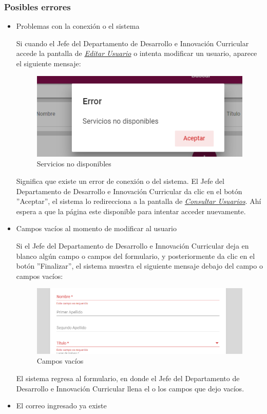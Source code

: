 \subsubsection{Posibles errores}
\begin{itemize}
	\item Problemas con la conexión o el sistema
	
	Si cuando el Jefe del Departamento de Desarrollo e Innovación Curricular accede la pantalla de \hyperlink{editarUs}{\textit{Editar Usuario}} o intenta modificar un usuario, aparece el siguiente mensaje:
	\clearpage
	\begin{figure}[H]
		\centering
		\includegraphics[width=0.4\linewidth]{images/SP5/MSGSN}
		\caption{Servicios no disponibles}
		
	\end{figure}
	
	
	Significa que existe un error de conexión o del sistema. El Jefe del Departamento de Desarrollo e Innovación Curricular da clic en el botón ''Aceptar'', el sistema lo redirecciona  a la pantalla de \hyperlink{consultarUs}{\textit{Consultar Usuarios}}. Ahí  espera a que la página este disponible para intentar acceder nuevamente.
	
	\item Campos vacíos al momento de modificar al usuario
	
	Si el Jefe del Departamento de Desarrollo e Innovación Curricular deja en blanco algún campo o campos del formulario, y posteriormente da clic en el botón ''Finalizar'', el sistema muestra el siguiente mensaje debajo del campo o campos vacíos:
	
	\begin{figure}[H]
		\centering
		\includegraphics[width=0.4\linewidth]{images/SP5/MSG44}
		\caption{Campos vacíos}
		\label{mensaje44}
		
	\end{figure}
	
	El sistema regresa  al formulario, en donde el Jefe del Departamento de Desarrollo e Innovación Curricular llena el o los campos que dejo vacíos.
	\item El correo ingresado ya existe
	

\end{itemize}

